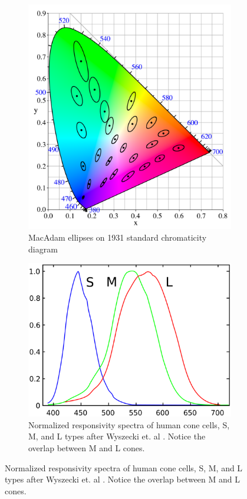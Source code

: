 \begin{figure}[htbp]
	\caption{Previous color reception research}
	\label{fig:greenscreen:stimula}	
	\centering
	\begin{subfigure}[t]{.35\textwidth}
		\centering
		\includegraphics[width=\textwidth]{_external/media/CIExy1931_MacAdam.png}
	\caption{MacAdam ellipses on 1931 standard chromaticity diagram 
		\cite{wiki:macadam:2017}}
	\end{subfigure}
	\begin{subfigure}[t]{.5\textwidth}
		\centering
		\includegraphics[width=\textwidth]{_external/media/1280px-Cones_SMJ2_E.png}
		\caption{Normalized responsivity spectra of human cone cells, S, M, and 
		L types after Wyszecki et. al \cite{wiki:Wyszecki:2017}. Notice the 
		overlap between M and L cones.}
	\end{subfigure}
\end{figure}
